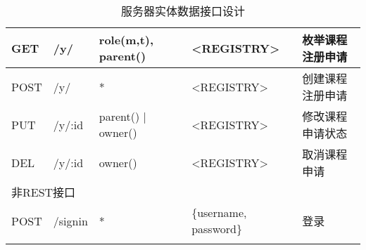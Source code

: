 \begin{longtable}{|p{1.2cm}|p{3cm}|p{3cm}|p{4cm}|X|}
  GET  & /y/    & role(m,t), parent()& <REGISTRY> & 枚举课程注册申请 \\ \hline
  POST & /y/    & *                  & <REGISTRY> & 创建课程注册申请 \\ \hline
  PUT  & /y/:id & parent() | owner() & <REGISTRY> & 修改课程申请状态 \\ \hline
  DEL  & /y/:id & owner()            & <REGISTRY> & 取消课程申请     \\ \hline

  \multicolumn{5}{|l|}{非REST接口} \\ \hline
  POST    & /signin                      & *             & \{username, password\} & 登录 \\ \hline

  \caption{服务器实体数据接口设计}

\end{longtable}

